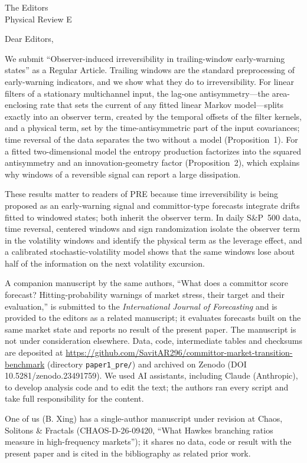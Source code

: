 \documentclass[11pt]{letter}
\newcommand{\ZenodoDOI}{10.5281/zenodo.23491759}
\begin{document}
\begin{letter}{The Editors\\Physical Review E}
\opening{Dear Editors,}
We submit ``Observer-induced irreversibility in trailing-window early-warning states'' as a Regular Article. Trailing windows are the standard preprocessing of early-warning indicators, and we show what they do to irreversibility. For linear filters of a stationary multichannel input, the lag-one antisymmetry---the area-enclosing rate that sets the current of any fitted linear Markov model---splits exactly into an observer term, created by the temporal offsets of the filter kernels, and a physical term, set by the time-antisymmetric part of the input covariances; time reversal of the data separates the two without a model (Proposition~1). For a fitted two-dimensional model the entropy production factorizes into the squared antisymmetry and an innovation-geometry factor (Proposition~2), which explains why windows of a reversible signal can report a large dissipation.

These results matter to readers of PRE because time irreversibility is being proposed as an early-warning signal and committor-type forecasts integrate drifts fitted to windowed states; both inherit the observer term. In daily S\&P~500 data, time reversal, centered windows and sign randomization isolate the observer term in the volatility windows and identify the physical term as the leverage effect, and a calibrated stochastic-volatility model shows that the same windows lose about half of the information on the next volatility excursion.

A companion manuscript by the same authors, ``What does a committor score forecast? Hitting-probability warnings of market stress, their target and their evaluation,'' is submitted to the \emph{International Journal of Forecasting} and is provided to the editors as a related manuscript; it evaluates forecasts built on the same market state and reports no result of the present paper. The manuscript is not under consideration elsewhere. Data, code, intermediate tables and checksums are deposited at \url{https://github.com/SavitAR296/committor-market-transition-benchmark} (directory \texttt{paper1\_pre/}) and archived on Zenodo (DOI \ZenodoDOI). We used AI assistants, including Claude (Anthropic), to develop analysis code and to edit the text; the authors ran every script and take full responsibility for the content.

One of us (B. Xing) has a single-author manuscript under revision at Chaos, Solitons \& Fractals (CHAOS-D-26-09420, ``What Hawkes branching ratios measure in high-frequency markets''); it shares no data, code or result with the present paper and is cited in the bibliography as related prior work.


\end{letter}
\end{document}
